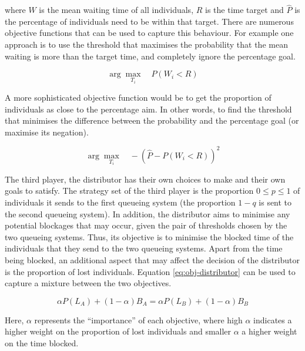where \(W\) is the mean waiting time of all individuals, \(R\) is the time 
target and \(\hat{P}\) is the percentage of individuals need to be within that 
target. 
There are numerous objective functions that can be used to capture this 
behaviour. 
For example one approach is to use the threshold that maximises the probability 
that 
the mean waiting is more than the target time, and completely ignore the 
percentage goal.

\begin{equation}
    \arg \max_{T_i} \quad P(W_i < R)
\end{equation}

A more sophisticated objective function would be to get the proportion 
of individuals as close to the percentage aim. 
In other words, to find the threshold that minimises the difference between the 
probability and the percentage goal (or maximise its negation).

\begin{equation}\label{eq:obj-queueing-systems}
    \arg \max_{T_i} \quad -\left( \hat{P} - P(W_i < R) \right)^2
\end{equation}


The third player, the distributor has their own choices to make and their own 
goals to satisfy.
The strategy set of the third player is the proportion \(0 \leq p \leq 1\) of 
individuals it sends to the first queueing system (the proportion \(1 - q\) is 
sent to the second queueing system).
In addition, the distributor aims to minimise any potential blockages
that may occur, given the pair of thresholds chosen by the two queueing systems.
Thus, its objective is to minimise the blocked time of the individuals 
that they send to the two queueing systems.
Apart from the time being blocked, an additional aspect that may affect the 
decision of the distributor is the proportion of lost individuals.
Equation \ref{eq:obj-distributor} can be used to capture a mixture 
between the two objectives.

\begin{equation}\label{eq:obj-distributor}
    \alpha P(L_A) + (1 - \alpha) B_A = 
    \alpha P(L_B) + (1 - \alpha) B_B
\end{equation}

Here, \(\alpha\) represents the ``importance'' of each objective,
where high \(\alpha\) indicates a higher weight on the proportion of lost 
individuals and smaller \(\alpha\) a higher weight on the time blocked. 


